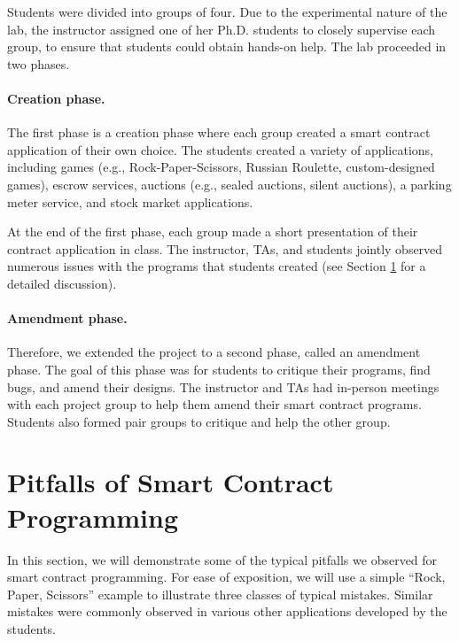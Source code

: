 \documentclass{llncs}
\begin{document}
Students were divided into groups of four.  
Due to the experimental nature of the lab, 
the instructor assigned one of her Ph.D. students 
to closely supervise each group, to ensure that students
could obtain hands-on help.
The lab proceeded in two phases. 

\paragraph{Creation phase.}
The first phase is a 
{creation} phase where each group created a 
smart contract application
of their own choice.
The students created a variety of applications, including
games (e.g., Rock-Paper-Scissors, Russian Roulette, custom-designed games),
escrow services, 
auctions (e.g., sealed auctions, silent auctions),
a parking meter 
service, and stock market applications.

At the end of the first phase, each group 
made a short presentation of their 
contract application in class.
The instructor, TAs, and students jointly observed numerous issues  
with the programs that students 
created (see Section \ref{sec:pitfalls} for a detailed
discussion). 

\paragraph{Amendment phase.}
Therefore, we extended the project to a second phase, called 
an {amendment} phase. 
The goal of this phase was for students to critique their programs,
find bugs, and amend their designs. 
The instructor and TAs had in-person meetings with each project group
to help them amend their smart contract programs.  
Students also formed pair groups to critique and 
help the other group. 



\section{Pitfalls of Smart Contract Programming}
\label{sec:pitfalls}
In this section, we will demonstrate some of the typical pitfalls
we observed for smart contract programming. 
For ease of exposition, we will use
a simple ``Rock, Paper, Scissors''  
example to illustrate three classes of typical mistakes.
Similar mistakes 
were commonly observed in various other 
applications developed by the students.  
\end{document}
